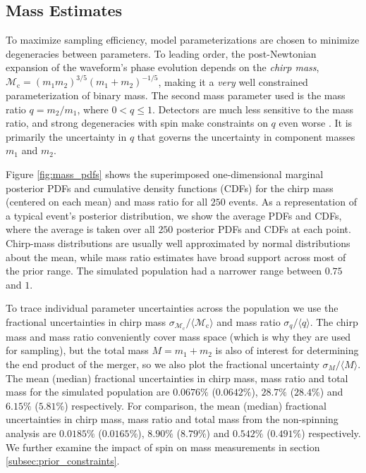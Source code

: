 \subsection{Mass Estimates}\label{sec:mass}
To maximize sampling efficiency, model parameterizations are chosen to minimize degeneracies between parameters.  To leading order, the post-Newtonian expansion of the waveform's phase evolution depends on the \textit{chirp mass}, $\mathcal{M}_\mathrm{c} = (m_1 m_2)^{3/5} (m_1 + m_2)^{-1/5}$, making it a \textit{very} well constrained parameterization of binary mass.  The second mass parameter used is the mass ratio $q = m_2/m_1$, where $0 < q \leq 1$.  Detectors are much less sensitive to the mass ratio, and strong degeneracies with spin make constraints on $q$ even worse \citep{Cutler_1994}.  It is primarily the uncertainty in $q$ that governs the uncertainty in component masses $m_1$ and $m_2$.

Figure \ref{fig:mass_pdfs} shows the superimposed one-dimensional marginal posterior PDFs and cumulative density functions (CDFs) for the chirp mass (centered on each mean) and mass ratio for all $250$ events.  As a representation of a typical event's posterior distribution, we show the average PDFs and CDFs, where the average is taken over all $250$ posterior PDFs and CDFs at each point. Chirp-mass distributions are usually well approximated by normal distributions about the mean, while mass ratio estimates have broad support across most of the prior range. The simulated population had a narrower range between $0.75$ and $1$.

To trace individual parameter uncertainties across the population we use the fractional uncertainties in chirp mass $\sigma_{\mathcal{M}_\mathrm{c}}/\langle\mathcal{M}_\mathrm{c}\rangle$ and mass ratio $\sigma_q/\langle q\rangle$. The chirp mass and mass ratio conveniently cover mass space (which is why they are used for sampling), but the total mass $M = m_1 + m_2$ is also of interest for determining the end product of the merger, so we also plot the fractional uncertainty $\sigma_M/\langle M\rangle$. The mean (median) fractional uncertainties in chirp mass, mass ratio and total mass for the simulated population are $0.0676\%$ ($0.0642\%$), $28.7\%$ ($28.4\%$) and $6.15\%$ ($5.81\%$) respectively. For comparison, the mean (median) fractional uncertainties in chirp mass, mass ratio and total mass from the non-spinning analysis are $0.0185\%$ ($0.0165\%$), $8.90\%$ ($8.79\%$) and $0.542\%$ ($0.491\%$) respectively.  We further examine the impact of spin on mass measurements in section \ref{subsec:prior_constraints}.

